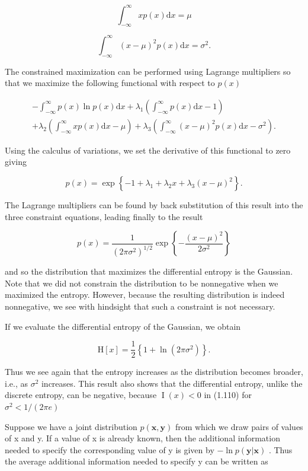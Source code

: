\documentclass[
  10
]{article}
\begin{document}
\[
\int_ {- \infty} ^ {\infty} x p (x) \mathrm{d} x = \mu\tag{1.106}
\]

\[
\int_ {- \infty} ^ {\infty} (x - \mu) ^ {2} p (x) \mathrm{d} x = \sigma^ {2}.\tag{1.107}
\]

The constrained maximization can be performed using Lagrange multipliers
so that we maximize the following functional with respect to \(p ( x )\)

\[
\begin{array}{l} - \int_ {- \infty} ^ {\infty} p (x) \ln p (x) \mathrm{d} x + \lambda_ {1} \left(\int_ {- \infty} ^ {\infty} p (x) \mathrm{d} x - 1\right) \\ + \lambda_ {2} \left(\int_ {- \infty} ^ {\infty} x p (x) \mathrm{d} x - \mu\right) + \lambda_ {3} \left(\int_ {- \infty} ^ {\infty} (x - \mu) ^ {2} p (x) \mathrm{d} x - \sigma^ {2}\right). \end{array}
\]

Using the calculus of variations, we set the derivative of this
functional to zero giving

\[
p (x) = \exp \left\{- 1 + \lambda_ {1} + \lambda_ {2} x + \lambda_ {3} (x - \mu) ^ {2} \right\}.\tag{1.108}
\]

The Lagrange multipliers can be found by back substitution of this
result into the three constraint equations, leading finally to the
result

\[
p (x) = \frac {1}{(2 \pi \sigma^ {2}) ^ {1 / 2}} \exp \left\{- \frac {(x - \mu) ^ {2}}{2 \sigma^ {2}} \right\}\tag{1.109}
\]

and so the distribution that maximizes the differential entropy is the
Gaussian. Note that we did not constrain the distribution to be
nonnegative when we maximized the entropy. However, because the
resulting distribution is indeed nonnegative, we see with hindsight that
such a constraint is not necessary.

If we evaluate the differential entropy of the Gaussian, we obtain

\[
\mathrm{H} [ x ] = \frac {1}{2} \left\{1 + \ln (2 \pi \sigma^ {2}) \right\}.\tag{1.110}
\]

Thus we see again that the entropy increases as the distribution becomes
broader, i.e., as \(\sigma ^ { 2 }\) increases. This result also shows
that the differential entropy, unlike the discrete entropy, can be
negative, because \(\operatorname { I } ( x ) < 0\) in (1.110) for
\(\sigma ^ { 2 } < 1 / ( 2 \pi e )\)

Suppose we have a joint distribution \(p ( \mathbf x , \mathbf y )\)
from which we draw pairs of values of x and y. If a value of x is
already known, then the additional information needed to specify the
corresponding value of y is given by
\(- \ln p ( \mathbf { y } | \mathbf { x } )\) . Thus the average
additional information needed to specify y can be written as
\end{document}
